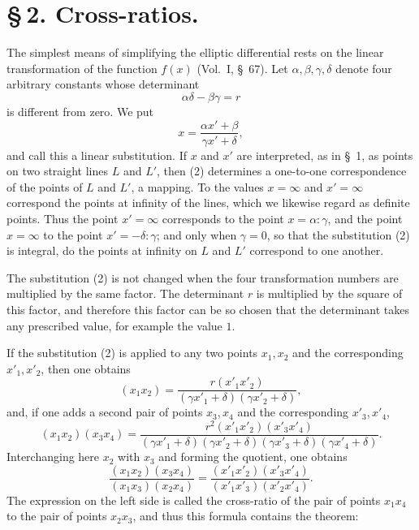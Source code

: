 \documentclass[11pt]{article}
\begin{document}
\section*{\S\,2. Cross-ratios.}

The simplest means of simplifying the elliptic differential rests on the linear transformation of the function $f(x)$ (Vol.~I, \S~67). Let $\alpha,\beta,\gamma,\delta$ denote four arbitrary constants whose determinant
\begin{equation}
\alpha\delta-\beta\gamma=r
\tag{1}
\end{equation}
is different from zero. We put
\begin{equation}
x=\frac{\alpha x'+\beta}{\gamma x'+\delta},
\tag{2}
\end{equation}
and call this a linear substitution. If $x$ and $x'$ are interpreted, as in \S~1, as points on two straight lines $L$ and $L'$, then (2) determines a one-to-one correspondence of the points of $L$ and $L'$, a mapping. To the values $x=\infty$ and $x'=\infty$ correspond the points at infinity of the lines, which we likewise regard as definite points. Thus the point $x'=\infty$ corresponds to the point $x=\alpha:\gamma$, and the point $x=\infty$ to the point $x'=-\delta:\gamma$; and only when $\gamma=0$, so that the substitution (2) is integral, do the points at infinity on $L$ and $L'$ correspond to one another.

The substitution (2) is not changed when the four transformation numbers are multiplied by the same factor. The determinant $r$ is multiplied by the square of this factor, and therefore this factor can be so chosen that the determinant takes any prescribed value, for example the value $1$.

If the substitution (2) is applied to any two points $x_1,x_2$ and the corresponding $x'_1,x'_2$, then one obtains
\[
(x_1x_2)=\frac{r(x'_1x'_2)}{(\gamma x'_1+\delta)(\gamma x'_2+\delta)},
\]
and, if one adds a second pair of points $x_3,x_4$ and the corresponding $x'_3,x'_4$,
\[
(x_1x_2)(x_3x_4)=\frac{r^2(x'_1x'_2)(x'_3x'_4)}{(\gamma x'_1+\delta)(\gamma x'_2+\delta)(\gamma x'_3+\delta)(\gamma x'_4+\delta)}.
\]
Interchanging here $x_2$ with $x_3$ and forming the quotient, one obtains
\begin{equation}
\frac{(x_1x_2)(x_3x_4)}{(x_1x_3)(x_2x_4)}=\frac{(x'_1x'_2)(x'_3x'_4)}{(x'_1x'_3)(x'_2x'_4)}.
\tag{3}
\end{equation}
The expression on the left side is called the cross-ratio of the pair of points $x_1x_4$ to the pair of points $x_2x_3$, and thus this formula contains the theorem:
\end{document}
